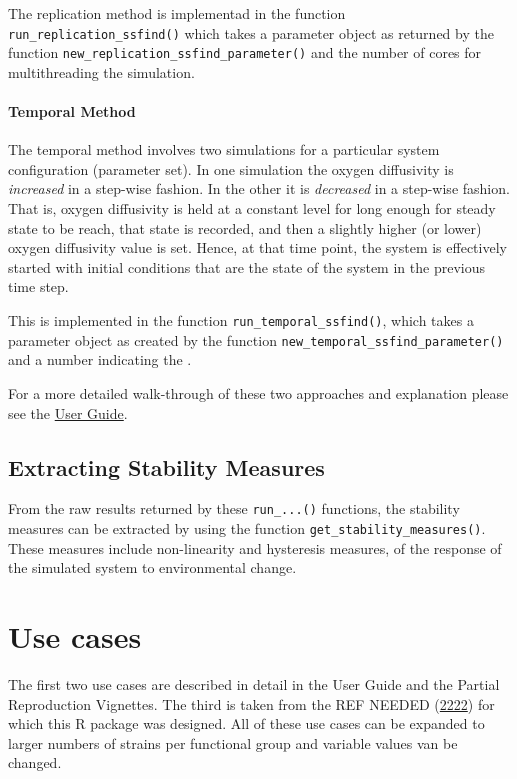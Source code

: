 \documentclass[]{elsarticle} %
\begin{document}
The replication method is implementad in the function
\texttt{run\_replication\_ssfind()} which takes a parameter object as
returned by the function \texttt{new\_replication\_ssfind\_parameter()}
and the number of cores for multithreading the simulation.

\hypertarget{temporal-method}{%
\paragraph{Temporal Method}\label{temporal-method}}

The temporal method involves two simulations for a particular system
configuration (parameter set). In one simulation the oxygen diffusivity
is \emph{increased} in a step-wise fashion. In the other it is
\emph{decreased} in a step-wise fashion. That is, oxygen diffusivity is
held at a constant level for long enough for steady state to be reach,
that state is recorded, and then a slightly higher (or lower) oxygen
diffusivity value is set. Hence, at that time point, the system is
effectively started with initial conditions that are the state of the
system in the previous time step.

This is implemented in the function \texttt{run\_temporal\_ssfind()},
which takes a parameter object as created by the function
\texttt{new\_temporal\_ssfind\_parameter()} and a number indicating the
.

For a more detailed walk-through of these two approaches and explanation
please see the \href{@LINK_NEEDED}{User Guide}.

\hypertarget{extracting-stability-measures}{%
\subsection{Extracting Stability
Measures}\label{extracting-stability-measures}}

From the raw results returned by these \texttt{run\_...()} functions,
the stability measures can be extracted by using the function
\texttt{get\_stability\_measures()}. These measures include
non-linearity and hysteresis measures, of the response of the simulated
system to environmental change.

\hypertarget{use-cases}{%
\section{Use cases}\label{use-cases}}

The first two use cases are described in detail in the User Guide and
the Partial Reproduction Vignettes. The third is taken from the REF
NEEDED (\protect\hyperlink{ref-REF_NEEDED}{2222}) for which this R
package was designed. All of these use cases can be expanded to larger
numbers of strains per functional group and variable values van be
changed.
\end{document}
